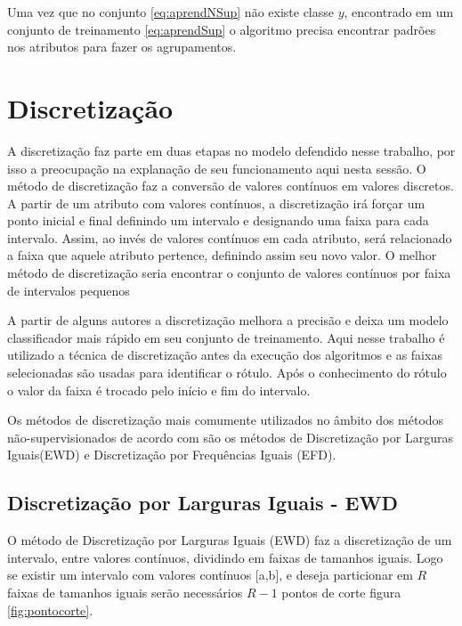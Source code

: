 Uma vez que no conjunto \ref{eq:aprendNSup} não existe classe ${y}$, encontrado em um conjunto de treinamento \ref{eq:aprendSup} o algoritmo precisa encontrar padrões nos atributos para fazer os agrupamentos.


\section{Discretização}\label{cap:refTeor:sec:discret}

A discretização faz parte em duas etapas no modelo defendido nesse trabalho, por isso a preocupação na explanação de seu funcionamento aqui nesta sessão. O método de discretização faz a conversão de valores contínuos em valores discretos. 
A partir de um atributo com valores contínuos, a discretização irá forçar um ponto inicial e final definindo um intervalo e designando uma faixa para cada intervalo. Assim, ao invés de valores contínuos em cada atributo, será relacionado a faixa que aquele atributo pertence, definindo assim seu novo valor. O melhor método de discretização seria encontrar o conjunto de valores contínuos por faixa de intervalos pequenos \cite{Kotsiantis2006}

A partir de alguns autores \cite{Catlett2006,Hwang2002} a discretização melhora a precisão e deixa um modelo classificador mais rápido em seu conjunto de treinamento. Aqui nesse trabalho é utilizado a técnica de discretização antes da execução dos algoritmos e as faixas selecionadas são usadas para identificar o rótulo. Após o conhecimento do rótulo o valor da faixa é trocado pelo início e fim do intervalo.

Os métodos de discretização mais comumente utilizados no âmbito dos métodos  não-supervisionados de acordo com \cite{Kotsiantis2006, Dougherty1995} são os métodos de Discretização por Larguras Iguais(EWD) e Discretização por Frequências Iguais (EFD).

\subsection{Discretização por Larguras Iguais - EWD}\label{cap:refTeor:subsec:ewd}

O método de Discretização por Larguras Iguais (EWD) faz a discretização de um intervalo, entre valores contínuos, dividindo em faixas de tamanhos iguais. Logo se existir um intervalo com valores contínuos [a,b], e deseja particionar em ${R}$ faixas de tamanhos iguais serão necessários ${R-1}$ pontos de corte figura \ref{fig:pontocorte}. 


